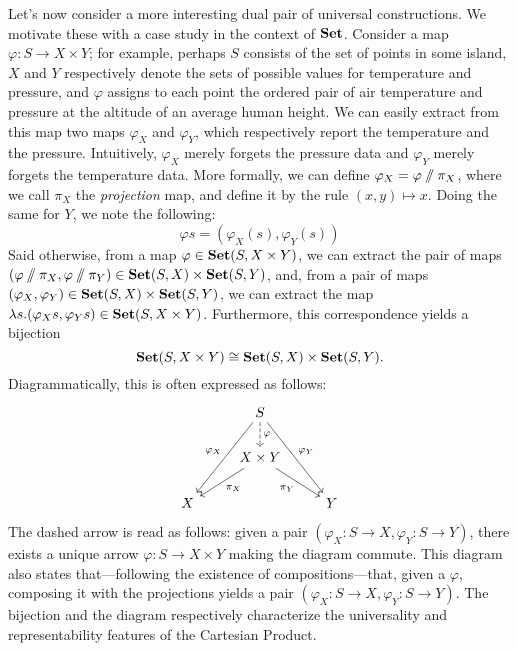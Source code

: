 Let's now consider a more interesting dual pair of universal constructions. We motivate these with a case study in the context of $\mathbf{Set}$. Consider a map $\varphi:S\to X\times Y$; for example, perhaps $S$ consists of the set of points in some island, $X$ and $Y$ respectively denote the sets of possible values for temperature and pressure, and $\varphi$ assigns to each point the ordered pair of air temperature and pressure at the altitude of an average human height. We can easily extract from this map two maps $\varphi_X$ and $\varphi_Y$, which respectively report the temperature and the pressure. Intuitively, $\varphi_X$ merely forgets the pressure data and $\varphi_Y$ merely forgets the temperature data. More formally, we can define $\varphi_X=\varphi\sslash\pi_X$, where we call $\pi_X$ the \emph{projection} map, and define it by the rule $(x,y)\mapsto x$. Doing the same for $Y$, we note the following:
\[\varphi s =(\varphi_X(s),\varphi_Y(s))\]
Said otherwise, from a map $\varphi\in\mathbf{Set}(S,X\times Y)$, we can extract the pair of maps $(\varphi\sslash \pi_X,\varphi\sslash \pi_Y)\in\mathbf{Set}(S,X)\times\mathbf{Set}(S,Y)$, and, from a pair of maps $(\varphi_X,\varphi_Y)\in\mathbf{Set}(S,X)\times\mathbf{Set}(S,Y)$, we can extract the map $\lambda s.(\varphi_Xs,\varphi_Ys)\in\mathbf{Set}(S,X\times Y)$. Furthermore, this correspondence yields a bijection
\[\mathbf{Set}(S,X\times Y)\cong\mathbf{Set}(S,X)\times\mathbf{Set}(S,Y).\]
Diagrammatically, this is often expressed as follows:
\[
\begin{tikzcd}
& S \arrow[d,"\varphi", dashed] \arrow[ddl,"\varphi_X"'] \arrow[ddr,"\varphi_Y"] & \\
& X\times Y \arrow[dl,"\pi_X"] \arrow[dr,"\pi_Y"'] &\\
X & & Y
\end{tikzcd}
\]
The dashed arrow is read as follows: given a pair $(\varphi_X:S\to X,\varphi_Y:S\to Y)$, there exists a unique arrow $\varphi:S\to X\times Y$ making the diagram commute. This diagram also states that---following the existence of compositions---that, given a $\varphi$, composing it with the projections yields a pair $(\varphi_X:S\to X,\varphi_Y:S\to Y)$. The bijection and the diagram respectively characterize the universality and representability features of the Cartesian Product.

